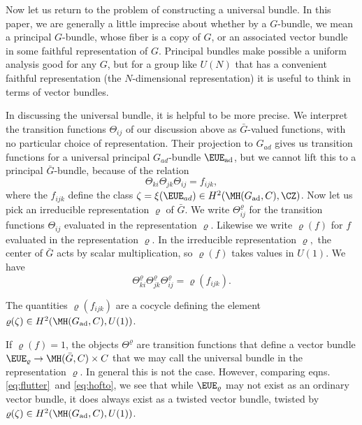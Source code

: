Now let us return to the problem of constructing a universal
bundle.  In this paper, we are generally a little imprecise about
whether by a $G$-bundle, we mean a principal $G$-bundle, whose
fiber is a copy of $G$, or an associated vector bundle in some
faithful  representation of $G$.  Principal bundles make possible
a uniform analysis good for any $G$, but for a group like $U(N)$
that has a convenient faithful representation (the $N$-dimensional
representation) it is useful to think in terms of vector bundles.

In discussing the universal bundle, it is helpful to be more
precise.  We interpret the transition functions $\Theta_{ij}$ of
our discussion above as $\bar G$-valued functions, with no
particular choice of representation.  Their projection to $G_{ad}$
gives us transition functions for a universal principal
$G_{ad}$-bundle ${\EUE}_{\rm ad}$, but we cannot lift this to a
principal $\bar G$-bundle, because of the relation
\setcounter{equation}{15}
\begin{equation}\label{eq:flutter}
\Theta_{ki}\Theta_{jk}\Theta_{ij}=f_{ijk},
\end{equation}
 where the
$f_{ijk}$ define the class $\zeta=\xi({\EUE}_{ad})\in
H^2(\MH(G_{\rm ad},C),\CZ)$. Now let us pick an irreducible
representation $\varrho$ of $\bar G$.  We write
$\Theta_{ij}^\varrho$ for the transition functions $\Theta_{ij}$
evaluated in the representation $\varrho$. Likewise we write
$\varrho(f)$ for $f$ evaluated in the representation $\varrho$. In
the irreducible representation $\varrho,$ the center of $\bar G$
acts by scalar multiplication, so $\varrho(f)$ takes values in
$U(1)$.  We have
\setcounter{equation}{16}
\begin{equation}\label{eq:glutter}
\Theta^\varrho_{ki}\Theta^\varrho_{jk}\Theta^\varrho_{ij}=\varrho(f_{ijk}).
\end{equation}

The quantities $\varrho(f_{ijk})$ are a cocycle defining the
element $\varrho(\zeta)\in H^2(\MH(G_{\rm ad},C),U(1))$.

If $\varrho(f)=1$, the objects $\Theta^\varrho$ are transition
functions that define a vector bundle ${\EUE}_\varrho\to \MH(\bar
G,C)\times C$ that we may call the universal bundle in the representation
$\varrho$.  In general this is not the case.  However, comparing
eqns. \eqref{eq:flutter}\ and \eqref{eq:hofto}, we see that while ${\EUE}_\varrho$ may
not exist as an ordinary vector bundle, it does always exist as a
twisted vector bundle, twisted by $\varrho(\zeta)\in
H^2(\MH(G_{\rm ad},C),U(1))$.
